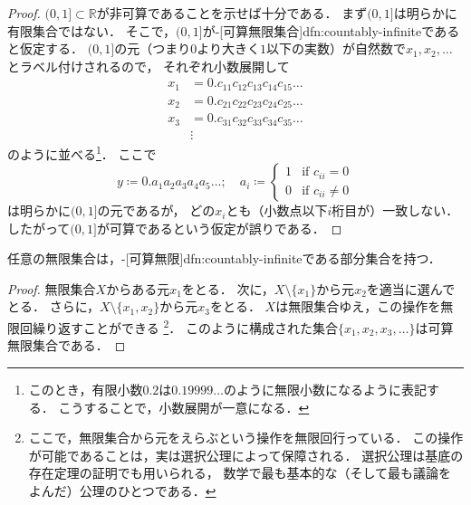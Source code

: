\documentclass[../sotsu.tex]{subfiles}
\begin{document}
\begin{proof}
    $(0, 1] \subset ℝ$が非可算であることを示せば十分である．
    まず$(0, 1]$は明らかに有限集合ではない．
    そこで，$(0, 1]$が-[可算無限集合]{dfn:countably-infinite}であると仮定する．
    $(0, 1]$の元（つまり$0$より大きく$1$以下の実数）が自然数で$x_1, x_2, \dotsc$とラベル付けされるので，
    それぞれ小数展開して
    \begin{align*}
        x_1 &= 0.c_{11}c_{12}c_{13}c_{14}c_{15}\dotso \\
        x_2 &= 0.c_{21}c_{22}c_{23}c_{24}c_{25}\dotso \\
        x_3 &= 0.c_{31}c_{32}c_{33}c_{34}c_{35}\dotso \\
        &\vdots 
    \end{align*}
    のように並べる\footnote{
        このとき，有限小数$0.2$は$0.19999\dotso$のように無限小数になるように表記する．
        こうすることで，小数展開が一意になる\cite[\S 7]{uchida-set-2020}．
    }．
    ここで
    \begin{equation*}
        y \coloneq 0. a_1 a_2 a_3 a_4 a_5 \dotso;
            \quad a_i \coloneq
            \begin{cases}
                1  &  \text{if } c_{ii}   =  0  \\
                0  &  \text{if } c_{ii} \neq 0
            \end{cases}
    \end{equation*}
    は明らかに$(0, 1]$の元であるが，
    どの$x_i$とも（小数点以下$i$桁目が）一致しない．
    したがって$(0, 1]$が可算であるという仮定が誤りである\cite[\S 7]{uchida-set-2020}．
\end{proof}



\begin{proposition}
    \label{thm:countable-subset}
    任意の無限集合は，-[可算無限]{dfn:countably-infinite}である部分集合を持つ．
\end{proposition}

\begin{proof}
    無限集合$X$からある元$x_1$をとる．
    次に，$X \setminus \{ x_1 \}$から元$x_2$を適当に選んでとる．
    さらに，$X \setminus \{ x_1, x_2 \}$から元$x_3$をとる．
    $X$は無限集合ゆえ，この操作を無限回繰り返すことができる%
    \footnote{
        ここで，無限集合から元をえらぶという操作を無限回行っている．
        この操作が可能であることは，実は選択公理によって保障される．
        選択公理は基底の存在定理の証明でも用いられる，
        数学で最も基本的な（そして最も議論をよんだ）公理のひとつである．
    }．
    このように構成された集合$\{ x_1, x_2, x_3, \dotsc \}$は可算無限集合である．
\end{proof}
\end{document}
